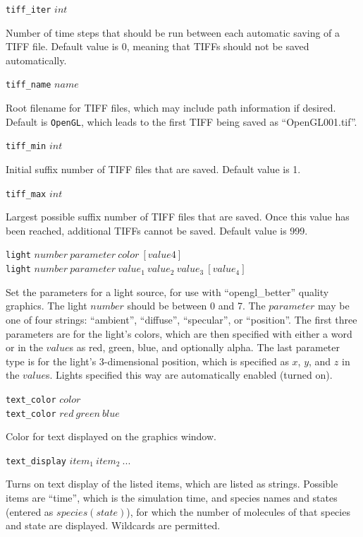\documentclass {scrbook}
\newcommand {\ttt} {\texttt}
\begin{document}
\begin{description}
\item{\ttt{tiff\_iter} $int$}

Number of time steps that should be run between each automatic saving of a TIFF file. Default value is 0, meaning that TIFFs should not be saved automatically.

\item{\ttt{tiff\_name} $name$}

Root filename for TIFF files, which may include path information if desired. Default is \ttt{OpenGL}, which leads to the first TIFF being saved as ``OpenGL001.tif''.

\item{\ttt{tiff\_min} $int$}

Initial suffix number of TIFF files that are saved. Default value is 1.

\item{\ttt{tiff\_max} $int$}

Largest possible suffix number of TIFF files that are saved. Once this value has been reached, additional TIFFs cannot be saved. Default value is 999.

\item{\ttt{light} $number\ parameter\ color\ [value4]$\\
\ttt{light} $number\ parameter\ value_1\ value_2\ value_3\ [value_4]$}

Set the parameters for a light source, for use with ``opengl\_better'' quality graphics. The light $number$ should be between 0 and 7. The $parameter$ may be one of four strings: ``ambient'', ``diffuse'', ``specular'', or ``position''. The first three parameters are for the light's colors, which are then specified with either a word or in the $value$s as red, green, blue, and optionally alpha. The last parameter type is for the light's 3-dimensional position, which is specified as $x$, $y$, and $z$ in the $value$s. Lights specified this way are automatically enabled (turned on).

\item{\ttt{text\_color} $color$\\
\ttt{text\_color} $red\ green\ blue$}

Color for text displayed on the graphics window.

\item{\ttt{text\_display} $item_1\ item_2\ ...$}

Turns on text display of the listed items, which are listed as strings. Possible items are ``time'', which is the simulation time, and species names and states (entered as $species(state)$), for which the number of molecules of that species and state are displayed. Wildcards are permitted.

\end{description}
\end{document}
